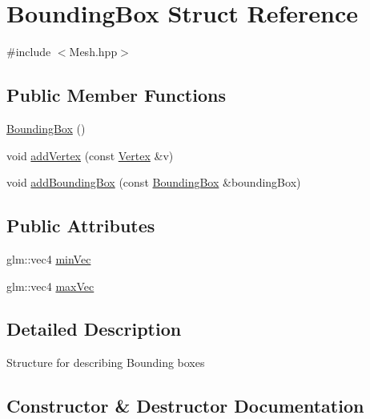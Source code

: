 \hypertarget{struct_bounding_box}{}\section{Bounding\+Box Struct Reference}
\label{struct_bounding_box}


{\ttfamily \#include $<$Mesh.\+hpp$>$}

\subsection*{Public Member Functions}
\begin{DoxyCompactItemize}
\item 
\hyperlink{struct_bounding_box_a6e401c4da5839950f1f30c8b8c4d1208}{Bounding\+Box} ()
\item 
void \hyperlink{struct_bounding_box_af49243215eee1a4a355262d0b948505d}{add\+Vertex} (const \hyperlink{struct_vertex}{Vertex} \&v)
\item 
void \hyperlink{struct_bounding_box_ad0e27df4662e1023c3e015898e126465}{add\+Bounding\+Box} (const \hyperlink{struct_bounding_box}{Bounding\+Box} \&bounding\+Box)
\end{DoxyCompactItemize}
\subsection*{Public Attributes}
\begin{DoxyCompactItemize}
\item 
glm\+::vec4 \hyperlink{struct_bounding_box_af0404f650a91d7c3212a2bd9db9ada56}{min\+Vec}
\item 
glm\+::vec4 \hyperlink{struct_bounding_box_a45c73eef0083449f657b8e25247123fd}{max\+Vec}
\end{DoxyCompactItemize}


\subsection{Detailed Description}
Structure for describing Bounding boxes 

\subsection{Constructor \& Destructor Documentation}
\hypertarget{struct_bounding_box_a6e401c4da5839950f1f30c8b8c4d1208}{}
